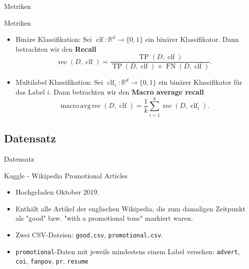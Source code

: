 \documentclass[aspectratio=169]{beamer} %
\newcommand{\clf}{\operatorname{clf}}
\newcommand{\rec}{\operatorname{rec}}
\newcommand{\tp}{\operatorname{TP}}
\newcommand{\fn}{\operatorname{FN}}
\begin{document}
\begin{frame}{Metriken}
    \begin{block}{Metriken}
        \begin{itemize}
            \item Binäre Klassifikation: Sei $\clf\colon \mathbb{R}^d\to \{0, 1\}$ ein binärer Klassifikator. Dann betrachten wir den \textbf{Recall}
                  \begin{equation*}
                      \rec(D, \clf) = \frac{\tp(D, \clf)}{\tp(D, \clf) + \fn(D, \clf)}.
                  \end{equation*}

            \item Multilabel Klassifikation: Sei $\clf_i\colon\mathbb{R}^d\to\{0, 1\}$ ein binärer Klassifikator für das Label $i$. Dann betrachten wir den \textbf{Macro average recall}
                  \begin{equation*}
                      \operatorname{macro\,avg\,rec}(D, \clf) = \frac{1}{k}\sum_{i=1}^k\rec (D, \clf_i).
                  \end{equation*}
        \end{itemize}
    \end{block}
\end{frame}

\subsection{Datensatz}

\begin{frame}{Datensatz}
    \begin{block}{Kaggle - Wikipedia Promotional Articles}
        \begin{itemize}
            \item Hochgeladen Oktober 2019.
            \item Enthält alle Artikel der englischen Wikipedia, die zum damaligen Zeitpunkt als "good" bzw. "with a promotional tone" markiert waren.
            \item Zwei CSV-Dateien: \texttt{good.csv}, \texttt{promotional.csv}.
            \item \texttt{promotional}-Daten mit jeweils mindestens einem Label versehen: \texttt{advert}, \texttt{coi}, \texttt{fanpov}, \texttt{pr}, \texttt{resume}
        \end{itemize}
    \end{block}
\end{frame}
\end{document}
